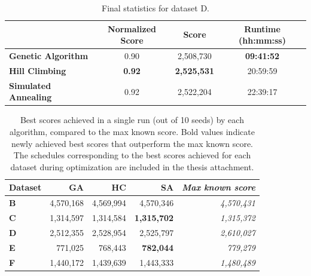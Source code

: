 \bigskip

\begin{table}[h]
\centering\footnotesize\sf
\begin{tabular}{lccc}
\toprule
& Normalized Score & Score & Runtime (hh:mm:ss) \\
\midrule
\textcolor{myblue}{\textbf{Genetic Algorithm}} & 0.90 & 2,508,730 & \textbf{09:41:52} \\
\textcolor{myorange}{\textbf{Hill Climbing}} & \textbf{0.92} & \textbf{2,525,531} & 20:59:59 \\
\textcolor{mygreen}{\textbf{Simulated Annealing}} & 0.92 & 2,522,204 & 22:39:17 \\
\bottomrule
\end{tabular}
\caption[Statistics for dataset D]{
    Final statistics for dataset D.
}
\label{tab:dataset_d_results}
\end{table}

\begin{table}
\centering\footnotesize\sf

\begin{tabular}{lr@{\hspace{0.5cm}}r@{\hspace{0.5cm}}r@{\hspace{0.5cm}}r}
\toprule
Dataset & \textcolor{myblue}{\textbf{GA}} & \textcolor{myorange}{\textbf{HC}} & \textcolor{mygreen}{\textbf{SA}} & \textit{Max known score} \\
\midrule
\textbf{B} & 4,570,168 & 4,569,994 & 4,570,346 & \textit{4,570,431} \\
\textbf{C} & 1,314,597 & 1,314,584 & \textbf{1,315,702} & \textit{1,315,372} \\
\textbf{D} & 2,512,355 & 2,528,954 & 2,525,797 & \textit{2,610,027} \\
\textbf{E} & 771,025 & 768,443 & \textbf{782,044} & \textit{779,279} \\
\textbf{F} & 1,440,172 & 1,439,639 & 1,443,333 & \textit{1,480,489} \\
\bottomrule
\end{tabular}

\caption[Best scores]{
    Best scores achieved in a single run (out of 10 seeds) by each algorithm, compared to the max known score. Bold values indicate newly achieved best scores that outperform the max known score. The schedules corresponding to the best scores achieved for each dataset during optimization are included in the thesis attachment.
}
\label{tab:best_scores}
\end{table}


